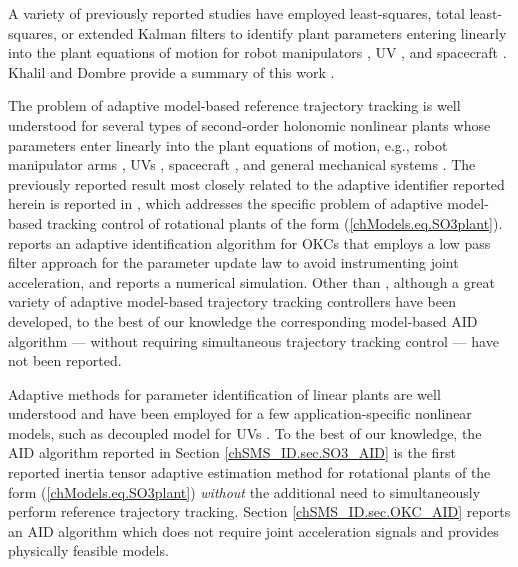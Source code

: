 A variety of previously reported studies have employed least-squares,
total least-squares, or extended Kalman filters to identify
plant parameters entering linearly into the plant equations of motion for 
robot manipulators \cite{khosla&kanade,an&atkeson&hollerbach},
\ac{UV} \cite{caccia.joe2000,alessandri.ca98,martin.thesis}, 
and spacecraft \cite{Norman2011,Keim2006}.  Khalil and
Dombre provide a summary of this work \cite{Khalil2002}.


The problem of adaptive model-based reference trajectory tracking is
well understood for several types of second-order holonomic nonlinear
plants whose parameters enter linearly into the plant equations of
motion, e.g., robot manipulator arms
\cite{Craig&hsu&sastry.ijrr87,slotine&li.ijrr87,horowitz&sadegh.ijrr90},
\acp{UV} \cite{Jordan2006}, spacecraft
\cite{kod.cdc85a,slotine1990}, and general mechanical systems
\cite{Lain1997}.
% 
The previously reported result most closely related to the adaptive
identifier reported herein is reported in
\cite{Chaturvedi2006}, which addresses the specific problem of
adaptive model-based tracking control of rotational plants of the form
(\ref{chModels.eq.SO3plant}).
%
\cite{hsu&bodson&sastry&paden.icra87} reports an adaptive
identification algorithm for \ac{OKC}s that employs a low pass
filter approach for the parameter update law to avoid instrumenting
joint acceleration, and reports a numerical simulation.
%
Other than \cite{hsu&bodson&sastry&paden.icra87}, although a great
variety of adaptive model-based trajectory tracking controllers have
been developed, to the best of our knowledge the corresponding
model-based \ac{AID} algorithm --- without requiring simultaneous
trajectory tracking control --- have not been reported.


Adaptive methods for parameter identification of linear plants are
well understood \cite{ksn&anu.book,sastry&bodson.book,astrom.book} and
have been employed for a few application-specific nonlinear models,
such as decoupled model for \acp{UV}
\cite{smallwood2003TCST}.
% 
To the best of our knowledge, the \ac{AID} algorithm reported in
Section \ref{chSMS_ID.sec.SO3_AID} is the first reported inertia
tensor adaptive estimation method for rotational plants of the
form (\ref{chModels.eq.SO3plant}) {\it without} the additional need to
simultaneously perform reference trajectory tracking.
%
Section \ref{chSMS_ID.sec.OKC_AID} reports an \ac{AID}
algorithm which does not require joint acceleration signals and
provides physically feasible models.
%

